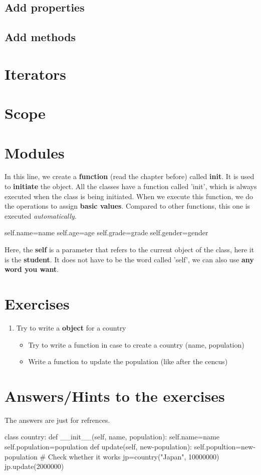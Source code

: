 \documentclass[12pt]{article}
\begin{document}
\subsection{Add properties}
\subsection{Add methods}
\section{Iterators}
\section{Scope}
\section{Modules}

\par In this line, we create a \textbf{function} (read the chapter before) called \textbf{init}. It is used to \textbf{initiate} the object. All the classes have a function called 'init', which is always executed when the class is being initiated. When we execute this function, we do the operations to assign \textbf{basic values}. Compared to other functions, this one is executed \textit{automatically}.
\begin{python}
  self.name=name	
	self.age=age
	self.grade=grade
	self.gender=gender
\end{python}
\par Here, the \textbf{self} is a parameter that refers to the current object of the class, here it is the \textbf{student}. It does not have to be the word called 'self', we can also use \textbf{any word you want}.
\section{Exercises}
\begin{enumerate}
	\item Try to write a \textbf{object} for a country
		\begin{itemize}
			\item Try to write a function in case to create a country (name, population)
			\item Write a function to update the population (like after the cencus)
		\end{itemize}
\end{enumerate}
\newpage
\section{Answers/Hints to the exercises}
The answers are just for refrences.
\begin{python}
class country:
	def \_\_init\_\_(self, name, population):
		self.name=name
		self.population=population
	def update(self, new-population):
		self.popultion=new-population
	# Check whether it works
jp=country("Japan", 10000000)
jp.update(2000000)
\end{python}
\newpage
\printbibliography
\end{document}

